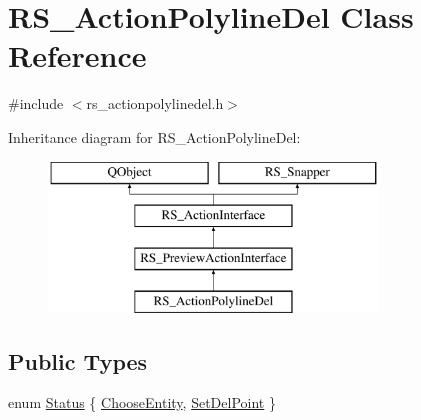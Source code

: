 \hypertarget{classRS__ActionPolylineDel}{\section{R\-S\-\_\-\-Action\-Polyline\-Del Class Reference}
\label{classRS__ActionPolylineDel}
}


{\ttfamily \#include $<$rs\-\_\-actionpolylinedel.\-h$>$}

Inheritance diagram for R\-S\-\_\-\-Action\-Polyline\-Del\-:\begin{figure}[H]
\begin{center}
\leavevmode
\includegraphics[height=4.000000cm]{classRS__ActionPolylineDel}
\end{center}
\end{figure}
\subsection*{Public Types}
\begin{DoxyCompactItemize}
\item 
enum \hyperlink{classRS__ActionPolylineDel_a9335b7146f6cb2176cabec390b784e67}{Status} \{ \hyperlink{classRS__ActionPolylineDel_a9335b7146f6cb2176cabec390b784e67a3c799d7e60c67b37e875afc16482548e}{Choose\-Entity}, 
\hyperlink{classRS__ActionPolylineDel_a9335b7146f6cb2176cabec390b784e67a2a26c7f0c6bba4b2636c9d8a1d5ee0ff}{Set\-Del\-Point}
 \}
\end{DoxyCompactItemize}
